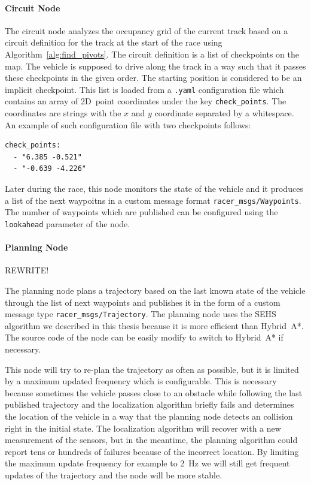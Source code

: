 \paragraph{Circuit Node}

The circuit node analyzes the occupancy grid of the current track based on a circuit definition for the track at the start of the race using Algorithm~\ref{alg:find_pivots}. The circuit definition is a list of checkpoints on the map. The vehicle is supposed to drive along the track in a way such that it passes these checkpoints in the given order. The starting position is considered to be an implicit checkpoint. This list is loaded from a \verb|.yaml| configuration file which contains an array of 2D~point coordinates under the key \verb|check_points|. The coordinates are strings with the $x$ and $y$ coordinate separated by a whitespace. An example of such configuration file with two checkpoints follows:

\begin{verbatim}
check_points:
  - "6.385 -0.521"
  - "-0.639 -4.226"
\end{verbatim} 

Later during the race, this node monitors the state of the vehicle and it produces a list of the next waypoitns in a custom message format
\texttt{racer\_msgs/\allowbreak Waypoints}. The number of waypoints which are published can be configured using the \texttt{lookahead} parameter of the node.

\paragraph{Planning Node}

REWRITE!

The planning node plans a trajectory based on the last known state of the vehicle through the list of next waypoints and publishes it in the form of a custom message type \verb|racer_msgs/Trajectory|. The planning node uses the SEHS algorithm we described in this thesis because it is more efficient than Hybrid~A*. The source code of the node can be easily modify to switch to Hybrid~A* if necessary.

This node will try to re-plan the trajectory as often as possible, but it is limited by a maximum updated frequency which is configurable. This is necessary because sometimes the vehicle passes close to an obstacle while following the last published trajectory and the localization algorithm briefly fails and determines the location of the vehicle in a way that the planning node detects an collision right in the initial state. The localization algorithm will recover with a new measurement of the sensors, but in the meantime, the planning algorithm could report tens or hundreds of failures because of the incorrect location. By limiting the maximum update frequency for example to \SI{2}{\hertz} we will still get frequent updates of the trajectory and the node will be more stable.

